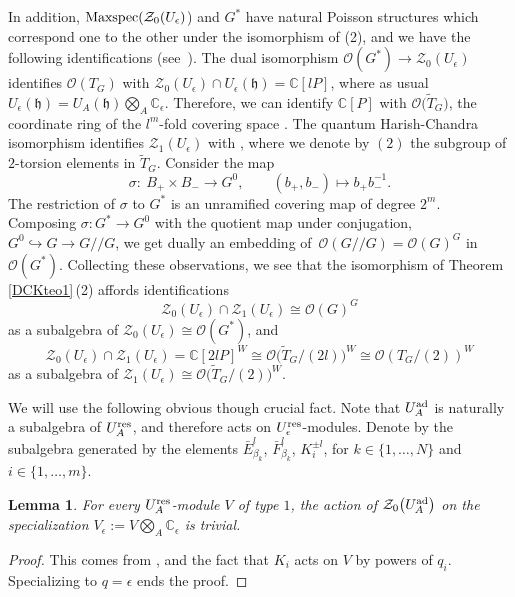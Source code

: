 \documentclass[pdftex]{sigma}
\numberwithin{equation}{section}
\newtheorem{lem}[teo]{Lemma}
\theoremstyle{definition}
\newcommand{\e}{\epsilon}
\newcommand{\mc}{\mathbb{C}}
\newcommand{\Oo}{{\mathcal O}}
\newcommand{\ra}{\rightarrow}
\begin{document}
In addition, ${\rm Maxspec}(\mathcal{Z}_0(U_\e)$) and $G^*$ have natural Poisson structures which correspond one to the other under the isomorphism of (2), and we have the following identifications (see~\cite[Section 21.2]{DC-K-P2}). The dual isomorphism $\mathcal{O}(G^*)\!\ra\! \mathcal{Z}_0(U_\e)$ identifies $\Oo(T_G)$ with ${\mathcal{Z}_0(U_\e)\! \cap \! U_\e(\mathfrak{h})\! =\! \mc[lP]}$, where as usual $U_\e(\mathfrak{h}) = U_A(\mathfrak{h}) \bigotimes_A \mc_\e$. Therefore, we can identify $\mc[P]$ with $\Oo\big(\tilde T_G\big)$, the coordinate ring of the $l^m$-fold covering space \smash{$\tilde T_G \ra T_G$}. The quantum Harish-Chandra isomorphism identifies $\mathcal{Z}_1(U_\e)$ with \smash{$\mc[2P]^W \cong \Oo\big(\tilde T_G/(2)\big)^W$}, where we denote by $(2)$ the subgroup of $2$-torsion elements in $\tilde T_G$. Consider the map
\[\sigma\colon\ B_+\times B_-\longrightarrow G^0,\qquad (b_+,b_-)\longmapsto b_+b_-^{-1}.\]
The restriction of $\sigma$ to $G^*$ is an unramified covering map of degree $2^m$.
Composing $\sigma\colon G^*\ra G^0$ with the quotient map under conjugation, $G^0 \hookrightarrow G \ra G/ /G$, we get dually an embedding of~${\Oo(G/ /G)=\mathcal{O}(G)^G}$ in $\mathcal{O}(G^*)$. Collecting these observations, we see that the isomorphism of Theorem \ref{DCKteo1}\,(2) affords identifications
\[\mathcal{Z}_0(U_\e)\cap \mathcal{Z}_1(U_\e) \cong \mathcal{O}(G)^G\]
as a subalgebra of $\mathcal{Z}_0(U_\e)\cong \Oo(G^*)$, and
\[\mathcal{Z}_0(U_\e)\cap \mathcal{Z}_1(U_\e) = \mc[2lP]^W \cong \Oo\bigl(\tilde T_G/(2l)\bigr)^W\cong \Oo(T_G/(2))^W\]
as a subalgebra of $\mathcal{Z}_1(U_\e)\cong \Oo\big(\tilde T_G/(2)\big)^W$.


We will use the following obvious though crucial fact. Note that $U_A^{\rm ad}$ is naturally a subalgebra of $U_A^{\rm res}$, and therefore acts on $U_\e^{\rm res}$-modules. Denote by  the subalgebra generated by the elements $\bar{E}_{\beta_k}^l$, $\bar {F}_{\beta_k}^l$, $K_i^{\pm l}$, for $k\in \{1,\dots, N\}$ and $i\in \{1,\dots,m\}$.
\begin{lem}\label{acttrivial} For every $U_A^{\rm res}$-module $V$ of type $1$, the action of $\mathcal{Z}_0\big(U_A^{\rm ad}\big)$ on the specialization $V_\e := V\bigotimes_A \mc_\e$ is trivial.
\end{lem}

\begin{proof} This comes from ,  and the fact that $K_i$ acts on $V$ by powers of $q_i$. Specializing to $q=\e$ ends the proof. \end{proof}
\end{document}
